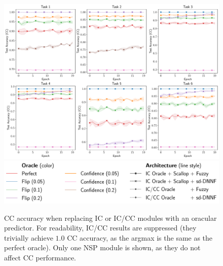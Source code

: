 \begin{figure}
	\centering
	\includegraphics[width=\linewidth]{imgs/ijcai/ablation_constraint_full.pdf}
	\includegraphics[width=\linewidth]{imgs/ijcai/ablation_task4_legend.pdf}
	\caption{\textsc{CC} accuracy when replacing \textsc{IC} or \textsc{IC/CC} modules with an oracular predictor. For readability, \textsc{IC/CC} results are suppressed (they trivially achieve $1.0$ \textsc{CC} accuracy, as the argmax is the same as the perfect oracle). Only one \textsc{NSP} module is shown, as they do not affect \textsc{CC} performance.}
	\label{ijcai:fig:abl-const}
\end{figure}

